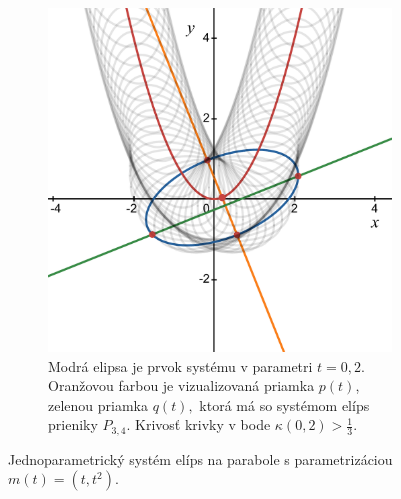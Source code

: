 \begin{figure}[h]
\begin{subfigure}[b]{0.49\textwidth}
        \includegraphics[width=\textwidth]{images/axis_t=0.2.pdf}
        	\caption{Modrá elipsa je prvok systému v parametri $t=0,2.$ Oranžovou farbou je vizualizovaná priamka $p(t)$, zelenou priamka $q(t),$ ktorá má so systémom elíps prieniky $P_{3,4}$. Krivosť krivky v bode $\kappa(0,2) > \frac{1}{3}.$}
        \label{fig:parabola_2}
    \end{subfigure}
    	\caption[Jednoparametrický systém elíps na parabole.]{Jednoparametrický systém elíps na parabole s parametrizáciou $m(t)=(t, t^2)$.}
    \label{fig:parabola}
\end{figure}


